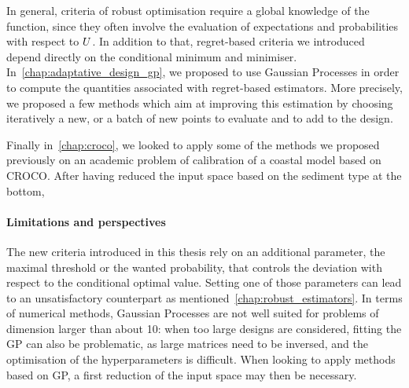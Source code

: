 \documentclass[../../Main_ManuscritThese.tex]{subfiles}
\begin{document}
In general, criteria of robust optimisation require a global
knowledge of the function, since they often involve the evaluation of
expectations and probabilities with respect to $U$. In addition to
that, regret-based criteria we introduced depend directly on the
conditional minimum and minimiser. In~\cref{chap:adaptative_design_gp},
we proposed to use Gaussian Processes in order to compute the
quantities associated with regret-based estimators. More precisely, we
proposed a few methods which aim at improving this estimation by
choosing iteratively a new, or a batch of new points to evaluate and
to add to the design.

Finally in~\cref{chap:croco}, we looked to apply some of the methods
we proposed previously on an academic problem of calibration of a
coastal model based on CROCO. After having reduced the input space
based on the sediment type at the bottom, 

\paragraph{Limitations and perspectives}
The new criteria introduced in this thesis rely on an additional
parameter, the maximal threshold or the wanted probability, that
controls the deviation with respect to the conditional optimal
value. Setting one of those parameters can lead to an unsatisfactory
counterpart as mentioned~\cref{chap:robust_estimators}. In terms of
numerical methods, Gaussian Processes are not well suited for problems
of dimension larger than about \num{10}: when too large designs are
considered, fitting the GP can also be problematic, as large matrices
need to be inversed, and the optimisation of the hyperparameters is
difficult.  When looking to apply methods based on GP, a first
reduction of the input space may then be necessary.

\subfileLocal{
	\pagestyle{empty}
	
        
}

\end{document}
